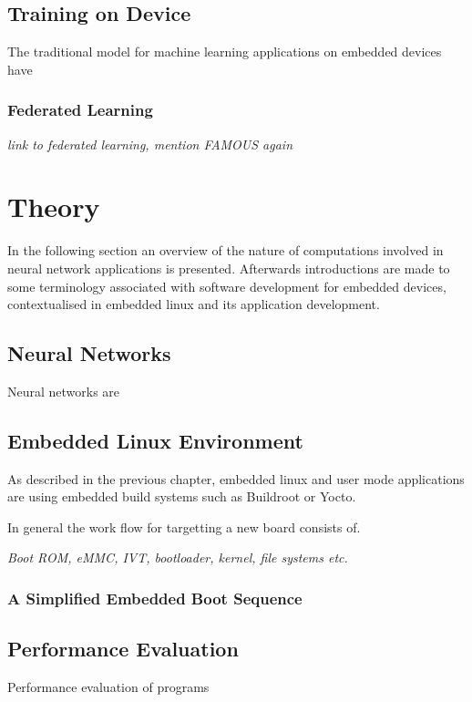 \section{Training on Device}

The traditional model for machine learning applications on embedded devices have

\subsection{Federated Learning}

\textit{link to federated learning, mention FAMOUS again}

\chapter{Theory}

In the following section an overview of the nature of computations involved in neural network applications is presented. Afterwards introductions are made to some terminology associated with software development for embedded devices, contextualised in embedded linux and its application development.

\section{Neural Networks}

Neural networks are

\section{Embedded Linux Environment}

As described in the previous chapter, embedded linux and user mode applications are using embedded build systems such as Buildroot or Yocto.

In general the work flow for targetting a new board consists of.

\textit{Boot ROM, eMMC, IVT, bootloader, kernel, file systems etc.}

\subsection{A Simplified Embedded Boot Sequence}

\section{Performance Evaluation}

Performance evaluation of programs
